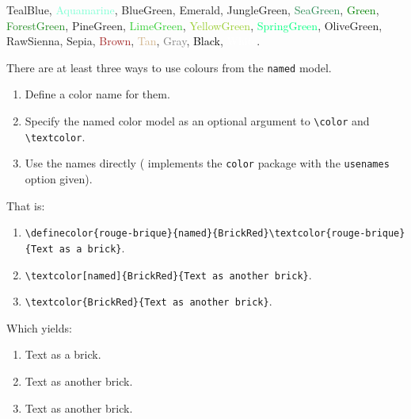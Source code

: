 \begin{flushleft}
\textcolor[named]{TealBlue}{TealBlue},
\textcolor[named]{Aquamarine}{Aquamarine},
\textcolor[named]{BlueGreen}{BlueGreen},
\textcolor[named]{Emerald}{Emerald},
\textcolor[named]{JungleGreen}{JungleGreen},
\textcolor[named]{SeaGreen}{SeaGreen},
\textcolor[named]{Green}{Green},
\textcolor[named]{ForestGreen}{ForestGreen},
\textcolor[named]{PineGreen}{PineGreen},
\textcolor[named]{LimeGreen}{LimeGreen},
\textcolor[named]{YellowGreen}{YellowGreen},
\textcolor[named]{SpringGreen}{SpringGreen},
\textcolor[named]{OliveGreen}{OliveGreen},
\textcolor[named]{RawSienna}{RawSienna},
\textcolor[named]{Sepia}{Sepia},
\textcolor[named]{Brown}{Brown},
\textcolor[named]{Tan}{Tan},
\textcolor[named]{Gray}{Gray},
\textcolor[named]{Black}{Black},
\textcolor[named]{White}{White}.
\end{flushleft}

There are at least three ways to use colours from the \texttt{named}
 model.
\begin{enumerate}
\item Define a color name for them.
\item Specify the named color model as an optional argument to
 \verb+\color+ and \verb+\textcolor+.
\item Use the names directly
(\hevea{} implements the \texttt{color} package with
the \texttt{usenames} option given).
\end{enumerate}
That is:
\begin{enumerate}
\item
\verb+\definecolor{rouge-brique}{named}{BrickRed}\textcolor{rouge-brique}{Text as a brick}+.
\item \verb+\textcolor[named]{BrickRed}{Text as another brick}+.
\item \verb+\textcolor{BrickRed}{Text as another brick}+.
\end{enumerate}
\ifhevea Which yields:
\begin{enumerate}
\item {}
\textcolor{rouge-brique}{Text as a brick}.
\item \textcolor[named]{BrickRed}{Text as another brick}.
\item \textcolor{BrickRed}{Text as another brick}.
\end{enumerate}\fi


